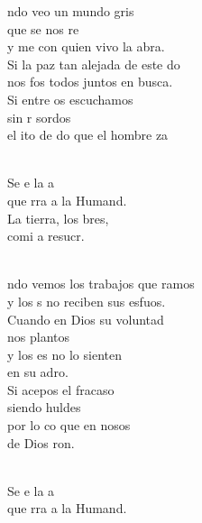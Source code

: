 \begin{cancion}%
	ndo veo un mundo gris \\
	que se nos re\\
	y me  con quien vivo la abra.\\
	Si la paz tan alejada de este do\\
	nos fos todos juntos en busca.\\
	Si entre os escuchamos \\
	sin r sordos\\
	el ito de do que el hombre za\\\jump\\
	\begin{chorus}%
	Se e la a\\
	que rra a la Humand.\\
	La tierra, los bres,\\
	comi a resucr.\\
	\end{chorus}%
	\jump\\
	ndo vemos los trabajos que ramos\\
	y los s no reciben sus esfuos.\\
Cuando en Dios su voluntad \\
	nos plantos\\
	y los es no lo sienten \\
	en su adro.\\
	Si acepos el fracaso \\
	siendo huldes\\
	por lo co que en nosos \\
	de Dios ron.\\\jump\\
	\begin{chorus}%
	Se e la a\\
	que rra a la Humand.\\

\end{chorus}
\end{cancion}

